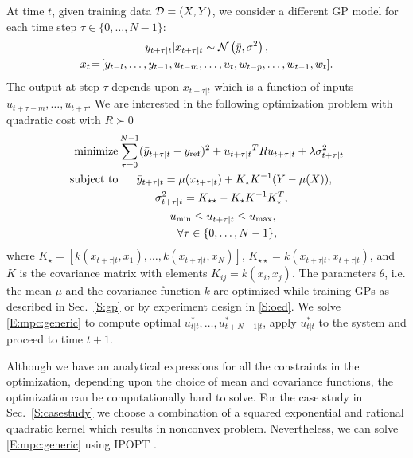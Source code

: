 At time \(t\), given training data \(\mathcal{D} = (X,Y) \), we consider a different GP model for each time step \(\tau \in \{0,\dots,N-1\}\):
\begin{gather}
y_{t+\tau|t} | x_{t+\tau|t} \sim \operatorname*{\mathcal{N}}\left(\bar{y}, \sigma^2\right), \\
x_{t}\!=\![y_{t-l}, \dots, y_{t-1}, u_{t-m}, \dots, u_t, w_{t-p}, \dots, w_{t-1}, w_t]. \nonumber
\end{gather}
The output at step \(\tau\) depends upon \(x_{t+\tau|t}\)  which is a function of inputs \(u_{t+\tau-m}, \dots, u_{t+\tau}\).
We are interested in the following optimization problem with quadratic cost with \(R \succ 0\)
\begin{align}
\label{E:mpc:generic}
\minimize & \sum_{\tau=0}^{N-1} (\bar{y}_{t+\tau|t}-y_{\mathrm{ref}})^2 + {u_{t+\tau|t}}^T R {u_{t+\tau|t}}+ \lambda \sigma^2_{t+\tau|t} \nonumber \\
\st & \ \ \ \ \ \bar{y}_{t+\tau|t} = \mu(x_{t+\tau|t}) + K_\star K^{-1} (Y - \mu(X)), \nonumber\\
& \ \ \ \ \ \ \ \ \ \ \sigma^2_{t+\tau|t} = K_{\star \star} - K_\star K^{-1} K_\star^T, \\
& \ \ \ \ \ \ \ \ \ \ \ \ \ \ u_{\mathrm{min}}  \leq u_{t+\tau|t} \leq u_{\mathrm{max}}, \nonumber\\
& \ \ \ \ \ \ \ \ \ \ \ \ \ \ \ \ \forall \tau \in \{0,\dots,N-1\}, \nonumber
\end{align}
where \(K_\star = [k(x_{t+\tau|t}, x_1), \dots, k(x_{t+\tau|t}, x_N)]\), \(K_{\star \star} = k(x_{t+\tau|t}, x_{t+\tau|t})\), and $K$ is the covariance matrix with elements \(K_{ij} = k(x_i, x_j)\). The parameters \(\theta\), i.e. the mean \(\mu\) and the covariance function \(k\) are optimized while training GPs as described in Sec.~\ref{S:gp} or by experiment design in \ref{S:oed}. We solve \eqref{E:mpc:generic} to compute optimal \(u_{t|t}^*, \dots, u_{t+N-1|t}^*\), apply \(u_{t|t}^*\) to the system and proceed to time \(t+1\).

Although we have an analytical expressions for all the constraints in the optimization, depending upon the choice of mean and covariance functions, the optimization can be computationally hard to solve. For the case study in Sec.~\ref{S:casestudy} we choose a combination of a squared exponential and rational quadratic kernel which results in nonconvex problem. Nevertheless, we can solve \eqref{E:mpc:generic} using IPOPT \cite{Waechter2009b}.